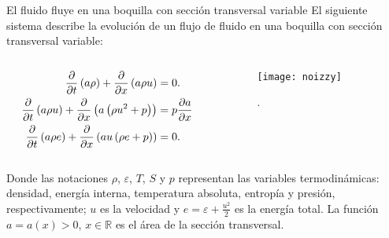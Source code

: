 \documentclass[
    8pt,
    aspectratio=1610,
    c,
    intlimits,
		handout,
    leqno,
    professionalfonts,
]{beamer}
\begin{document}
\begin{frame}
	\begin{block}{El fluido fluye en una boquilla con sección transversal variable}
		El siguiente sistema describe la evolución de un flujo de fluido
		en una boquilla con sección transversal variable:
		\begin{columns}
			\begin{column}{.35\paperwidth}
				\begin{equation}\label{eq:1}
					\begin{aligned}
						\diffp{}{t}
						\left(a\rho\right)+
						\diffp{}{x}
						\left(a\rho u\right)                    & =
						0.                                          \\
						\diffp{}{t}
						\left(a\rho u\right)+
						\diffp{}{x}
						\left(a\left(\rho u^{2}+p\right)\right) & =
						p\diffp{a}{x}                               \\
						\diffp{}{t}
						\left(a\rho e\right)+
						\diffp{}{x}
						\left(au\left(\rho e+p\right)\right)    & =
						0.
					\end{aligned}
				\end{equation}
			\end{column}
			\begin{column}{.35\paperwidth}
				\begin{figure}[ht!]
					\centering
					\texttt{[image: noizzy]}
					\caption{.}
				\end{figure}
			\end{column}
		\end{columns}
		Donde las notaciones $\rho$, $\varepsilon$, $T$, $S$ y $p$
		representan las variables termodinámicas: densidad, energía
		interna, temperatura absoluta, entropía y presión,
		respectivamente; $u$ es la velocidad y
		$e=\varepsilon+\frac{u^{2}}{2}$ es la energía total.
		La función $a=a\left(x\right)>0$, $x\in\mathbb{R}$ es el área de
		la sección transversal.
	\end{block}
\end{frame}
\end{document}
